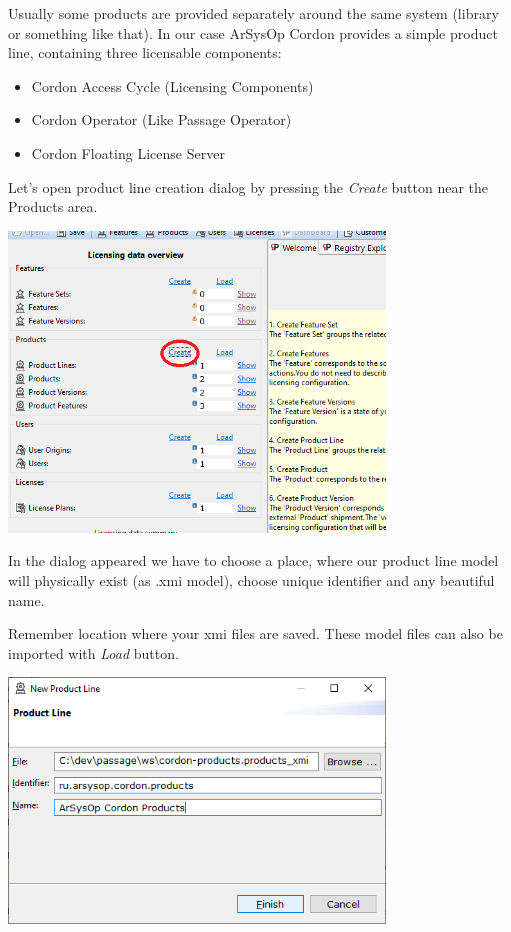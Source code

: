 \documentclass[12pt]{report}
\begin{document}
Usually some products are provided separately around the same system (library or something like that). In our case ArSysOp Cordon provides a simple product line, containing three licensable components:
\begin{itemize}
    \item Cordon Access Cycle (Licensing Components)
    \item Cordon Operator (Like Passage Operator)
    \item Cordon Floating License Server
\end{itemize}

Let's open product line creation dialog by pressing the \textit{Create} button near the Products area.

\begin{center}
    \includegraphics[width=0.75\textwidth]{product_line_create}
\end{center}

In the dialog appeared we have to choose a place, where our product line model will physically exist (as .xmi model), choose unique identifier and any beautiful name.

Remember location where your xmi files are saved. These model files can also be imported with \textit{Load} button.

\begin{center}
    \includegraphics[width=0.75\textwidth]{product_line_dialog}
\end{center}
\end{document}
